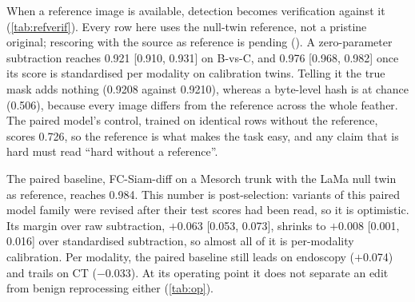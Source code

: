 When a reference image is available, detection becomes verification against it (\cref{tab:refverif}).
Every row here uses the null-twin reference, not a pristine original; rescoring with the source as reference is pending ().
A zero-parameter subtraction reaches 0.921 [0.910, 0.931] on B-vs-C, %
and 0.976 [0.968, 0.982] once its score is standardised per modality on calibration twins. %
Telling it the true mask adds nothing (0.9208 against 0.9210), %
whereas a byte-level hash is at chance (0.506), %
because every image differs from the reference across the whole feather.
The paired model's control, trained on identical rows without the reference, scores 0.726, %
so the reference is what makes the task easy, and any claim that \dataset is hard must read ``hard without a reference''.

The paired baseline, FC-Siam-diff on a Mesorch trunk with the LaMa null twin as reference, reaches 0.984. %
This number is post-selection: variants of this paired model family were revised after their test scores had been read, so it is optimistic. %
Its margin over raw subtraction, $+$0.063 [0.053, 0.073], %
shrinks to $+$0.008 [0.001, 0.016] over standardised subtraction, %
so almost all of it is per-modality calibration.
Per modality, the paired baseline still leads on endoscopy ($+$0.074) and trails on CT ($-$0.033). %
At its operating point it does not separate an edit from benign reprocessing either (\cref{tab:op}).

